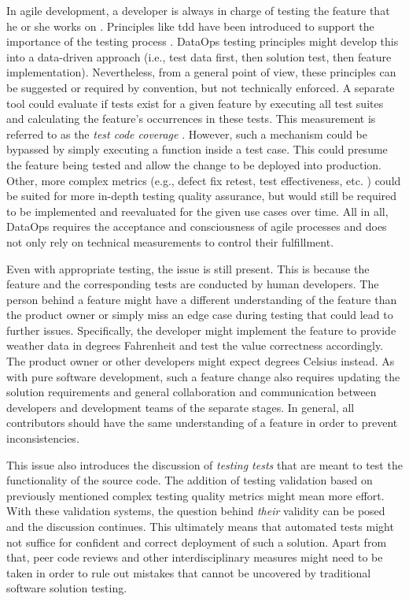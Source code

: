 In agile development, a developer is always in charge of testing the feature that he or she works on \cite[18]{Kaiser}. Principles like \ac{tdd} have been introduced to support the importance of the testing process \cite[1]{Karac2018}. DataOps testing principles might develop this into a data-driven approach (i.e., test data first, then solution test, then feature implementation). Nevertheless, from a general point of view, these principles can be suggested or required by convention, but not technically enforced. A separate tool could evaluate if tests exist for a given feature by executing all test suites and calculating the feature's occurrences in these tests. This measurement is referred to as the \textit{test code coverage} \cite[15]{Garrett2011}. However, such a mechanism could be bypassed by simply executing a function inside a test case. This could presume the feature being tested and allow the change to be deployed into production. Other, more complex metrics (e.g., defect fix retest, test effectiveness, etc. \cite[15]{Garrett2011}) could be suited for more in-depth testing quality assurance, but would still be required to be implemented and reevaluated for the given use cases over time.  All in all, DataOps requires the acceptance and consciousness of agile processes and does not only rely on technical measurements to control their fulfillment.

Even with appropriate testing, the issue is still present. This is because the feature and the corresponding tests are conducted by human developers. The person behind a feature might have a different understanding of the feature than the product owner or simply miss an edge case during testing that could lead to further issues. Specifically, the developer might implement the feature to provide weather data in degrees Fahrenheit and test the value correctness accordingly. The product owner or other developers might expect degrees Celsius instead. As with pure software development, such a feature change also requires updating the solution requirements and general collaboration and communication between developers and development teams of the separate stages. In general, all contributors should have the same understanding of a feature in order to prevent inconsistencies.

This issue also introduces the discussion of \textit{testing tests} that are meant to test the functionality of the source code. The addition of testing validation based on previously mentioned complex testing quality metrics might mean more effort. With these validation systems, the question behind \textit{their} validity can be posed and the discussion continues. This ultimately means that automated tests might not suffice for confident and correct deployment of such a solution. Apart from that, peer code reviews and other interdisciplinary measures might need to be taken in order to rule out mistakes that cannot be uncovered by traditional software solution testing.


